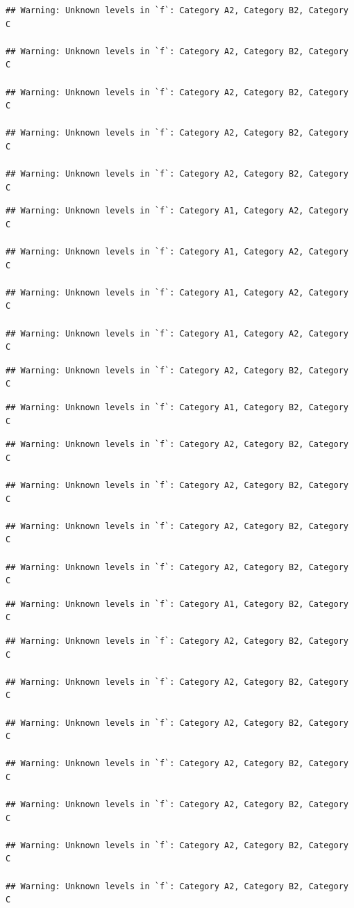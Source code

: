 \documentclass[preprint, 3p,
authoryear]{elsarticle} %
\begin{document}
\begin{verbatim}
## Warning: Unknown levels in `f`: Category A2, Category B2, Category C

## Warning: Unknown levels in `f`: Category A2, Category B2, Category C

## Warning: Unknown levels in `f`: Category A2, Category B2, Category C

## Warning: Unknown levels in `f`: Category A2, Category B2, Category C

## Warning: Unknown levels in `f`: Category A2, Category B2, Category C
\end{verbatim}

\begin{verbatim}
## Warning: Unknown levels in `f`: Category A1, Category A2, Category C

## Warning: Unknown levels in `f`: Category A1, Category A2, Category C

## Warning: Unknown levels in `f`: Category A1, Category A2, Category C

## Warning: Unknown levels in `f`: Category A1, Category A2, Category C
\end{verbatim}

\begin{verbatim}
## Warning: Unknown levels in `f`: Category A2, Category B2, Category C
\end{verbatim}

\begin{verbatim}
## Warning: Unknown levels in `f`: Category A1, Category B2, Category C
\end{verbatim}

\begin{verbatim}
## Warning: Unknown levels in `f`: Category A2, Category B2, Category C

## Warning: Unknown levels in `f`: Category A2, Category B2, Category C

## Warning: Unknown levels in `f`: Category A2, Category B2, Category C

## Warning: Unknown levels in `f`: Category A2, Category B2, Category C
\end{verbatim}

\begin{verbatim}
## Warning: Unknown levels in `f`: Category A1, Category B2, Category C
\end{verbatim}

\begin{verbatim}
## Warning: Unknown levels in `f`: Category A2, Category B2, Category C

## Warning: Unknown levels in `f`: Category A2, Category B2, Category C

## Warning: Unknown levels in `f`: Category A2, Category B2, Category C

## Warning: Unknown levels in `f`: Category A2, Category B2, Category C

## Warning: Unknown levels in `f`: Category A2, Category B2, Category C

## Warning: Unknown levels in `f`: Category A2, Category B2, Category C

## Warning: Unknown levels in `f`: Category A2, Category B2, Category C
\end{verbatim}
\end{document}
